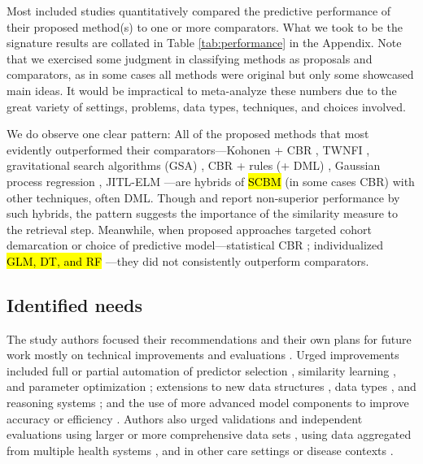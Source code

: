 \documentclass[sn-mathphys,Numbered,pdflatex]{sn-jnl}
\theoremstyle{remark}
\theoremstyle{definition}
\begin{document}
Most included studies quantitatively compared the predictive performance
of their proposed method(s) to one or more comparators. What we took to
be the signature results are collated in Table \ref{tab:performance} in
the Appendix. Note that we exercised some judgment in classifying
methods as proposals and comparators, as in some cases all methods were
original but only some showcased main ideas. It would be impractical to
meta-analyze these numbers due to the great variety of settings,
problems, data types, techniques, and choices involved.

We do observe one clear pattern: All of the proposed methods that most
evidently outperformed their comparators---Kohonen + CBR
\citep{Wyns2004}, TWNFI \citep{Song2006, Kasabov2010}, gravitational
search algorithms (GSA) \citep{Liang2015}, CBR + rules (+ DML)
\citep{Nicolas2014}, Gaussian process regression \citep{Zhang2018},
JITL-ELM \citep{Ma2020}---are hybrids of \hl{SCBM} (in some cases CBR)
with other techniques, often DML. Though \citet{CampilloGimenez2013} and
\citet{Ng2015} report non-superior performance by such hybrids, the
pattern suggests the importance of the similarity measure to the
retrieval step. Meanwhile, when proposed approaches targeted cohort
demarcation or choice of predictive model---statistical CBR
\citep{Park2006}; individualized \hl{GLM, DT, and RF}
\citep{Lee2015, Lee2017}---they did not consistently outperform
comparators.

\subsection{Identified needs}\label{identified-needs}

The study authors focused their recommendations and their own plans for
future work mostly on technical improvements and evaluations
\citep{Mariuzzi1997, Yearwood1997}. Urged improvements included full or
partial automation of predictor selection
\citep{Mariuzzi1997, Yearwood1997}, similarity learning
\citep{Mariuzzi1997, Wang2019}, and parameter optimization
\citep{Song2006, Lee2017}; extensions to new data structures
\citep{Lopez2011}, data types \citep{Liang2015, Verma2015, Malykh2018},
and reasoning systems \citep{Nicolas2014}; and the use of more advanced
model components to improve accuracy or efficiency
\citep{Lowsky2013, Lee2015, Liang2015, Zhang2018}. Authors also urged
validations and independent evaluations using larger or more
comprehensive data sets \citep{Elter2007, Xu2008, Verma2015, Ng2015},
using data aggregated from multiple health systems
\citep{Lee2015, Lee2017, Tang2021, Ng2021}, and in other care settings
or disease contexts \citep{Song2006, Zhang2018, Tang2021, Ng2021}.
\end{document}
